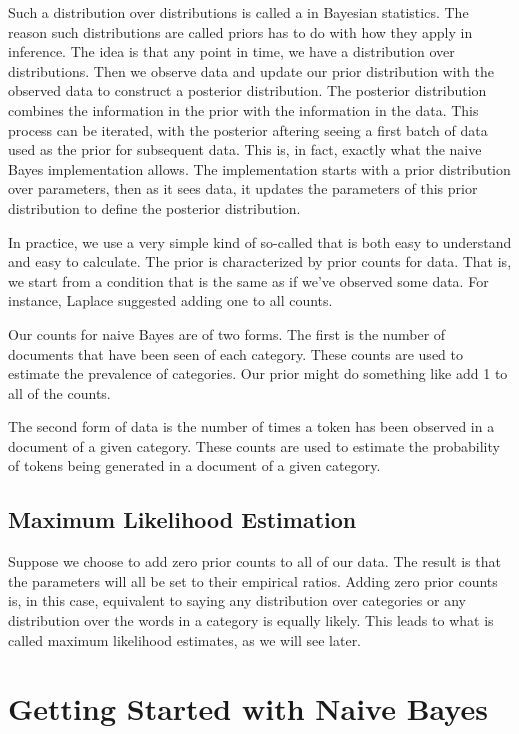 Such a distribution over distributions is called a  in
Bayesian statistics.  The reason such distributions are called priors
has to do with how they apply in inference.  The idea is that any
point in time, we have a distribution over distributions.  Then we
observe data and update our prior distribution with the observed data
to construct a posterior distribution.  The posterior distribution
combines the information in the prior with the information in the
data.  This process can be iterated, with the posterior aftering
seeing a first batch of data used as the prior for subsequent data.
This is, in fact, exactly what the naive Bayes implementation allows.
The implementation starts with a prior distribution over parameters,
then as it sees data, it updates the parameters of this prior
distribution to define the posterior distribution.  

In practice, we use a very simple kind of so-called  that is both easy to understand and easy to calculate.
The prior is characterized by prior counts for data.  That is, we
start from a condition that is the same as if we've observed some
data.  For instance, Laplace suggested adding one to all counts.

Our counts for naive Bayes are of two forms.  The first is the
number of documents that have been seen of each category.  These
counts are used to estimate the prevalence of categories.  Our
prior might do something like add 1 to all of the counts.  

The second form of data is the number of times a token has been
observed in a document of a given category.  These counts are
used to estimate the probability of tokens being generated in
a document of a given category.  

\subsection{Maximum Likelihood Estimation}

Suppose we choose to add zero prior counts to all of our data.  The
result is that the parameters will all be set to their empirical
ratios.  Adding zero prior counts is, in this case, equivalent to
saying any distribution over categories or any distribution over the
words in a category is equally likely.  This leads to what is called
maximum likelihood estimates, as we will see later.


\section{Getting Started with Naive Bayes}\label{section:nb-getting-started}

